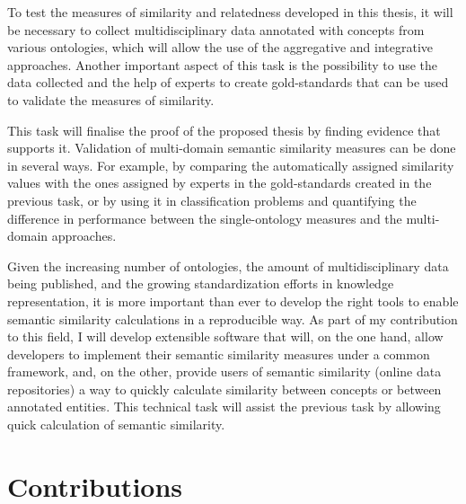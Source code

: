 
To test the measures of similarity and relatedness developed in this thesis, it will be necessary to collect multidisciplinary data annotated with concepts from various ontologies, which will allow the use of the aggregative and integrative approaches. Another important aspect of this task is the possibility to use the data collected and the help of experts to create gold-standards that can be used to validate the measures of similarity.

This task will finalise the proof of the proposed thesis by finding evidence that supports it. Validation of multi-domain semantic similarity measures can be done in several ways. For example, by comparing the automatically assigned similarity values with the ones assigned by experts in the gold-standards created in the previous task, or by using it in classification problems and quantifying the difference in performance between the single-ontology measures and the multi-domain approaches.

Given the increasing number of ontologies, the amount of multidisciplinary data being published, and the growing standardization efforts in knowledge representation, it is more important than ever to develop the right tools to enable semantic similarity calculations in a reproducible way. As part of my contribution to this field, I will develop extensible software that will, on the one hand, allow developers to implement their semantic similarity measures under a common framework, and, on the other, provide users of semantic similarity (\eg online data repositories) a way to quickly calculate similarity between concepts or between annotated entities. This technical task will assist the previous task by allowing quick calculation of semantic similarity.


\section{Contributions} \label{sec:intro/contributions}

